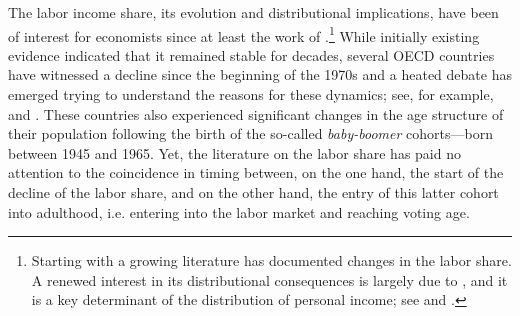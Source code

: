 The labor income share, its evolution and distributional implications, have been of interest for economists since at least the work of \citet{Kaldor1955Alternative}.\footnote{Starting with \citet{Blanchard1997Medium} a growing literature has documented changes in the labor share. A renewed interest in its distributional consequences is largely due to \citet{Atkinson2009Factor}, and it is a key determinant of the distribution of personal income; see \citet{Checchi2010Labour} and \citet{Bengtsson2018Capital}.}
While initially existing evidence indicated that it remained stable for decades, several OECD countries have witnessed a decline since the beginning of the 1970s and a heated debate has emerged trying to understand the reasons for these dynamics; see, for example, \citet{Karabarbounis2014Global} and \citet{Elsby2013Decline}. These countries also experienced significant changes in the age structure of their population following the birth of the so-called \textit{baby-boomer} cohorts---born between 1945 and 1965. 
Yet, the literature on the labor share has paid no attention to the coincidence in timing between, on the one hand, the start of the decline of the labor share, and on the other hand, the entry of this latter cohort into adulthood, i.e. entering into the labor market and reaching voting age.

